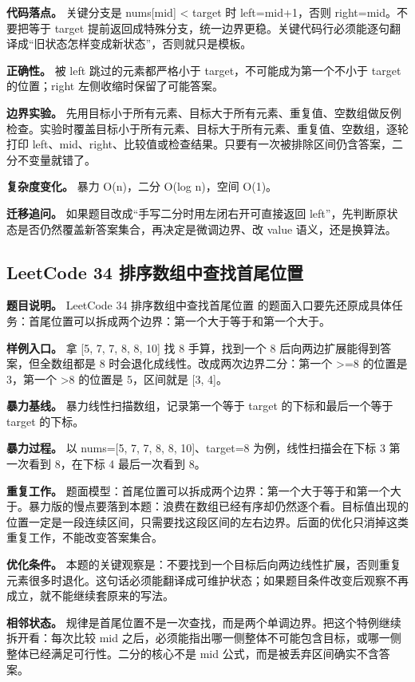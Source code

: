 \textbf{代码落点。} 关键分支是 nums[mid] < target 时 left=mid+1，否则 right=mid。不要把等于 target 提前返回成特殊分支，统一边界更稳。关键代码行必须能逐句翻译成“旧状态怎样变成新状态”，否则就只是模板。

\textbf{正确性。} 被 left 跳过的元素都严格小于 target，不可能成为第一个不小于 target 的位置；right 左侧收缩时保留了可能答案。

\textbf{边界实验。} 先用目标小于所有元素、目标大于所有元素、重复值、空数组做反例检查。实验时覆盖目标小于所有元素、目标大于所有元素、重复值、空数组，逐轮打印 left、mid、right、比较值或检查结果。只要有一次被排除区间仍含答案，二分不变量就错了。

\textbf{复杂度变化。} 暴力 O(n)，二分 O(log n)，空间 O(1)。

\textbf{迁移追问。} 如果题目改成“手写二分时用左闭右开可直接返回 left”，先判断原状态是否仍然覆盖新答案集合，再决定是微调边界、改 value 语义，还是换算法。

\subsection{LeetCode 34 排序数组中查找首尾位置}

\textbf{题目说明。} LeetCode 34 排序数组中查找首尾位置 的题面入口要先还原成具体任务：首尾位置可以拆成两个边界：第一个大于等于和第一个大于。

\textbf{样例入口。} 拿 [5, 7, 7, 8, 8, 10] 找 8 手算，找到一个 8 后向两边扩展能得到答案，但全数组都是 8 时会退化成线性。改成两次边界二分：第一个 >=8 的位置是 3，第一个 >8 的位置是 5，区间就是 [3, 4]。

\textbf{暴力基线。} 暴力线性扫描数组，记录第一个等于 target 的下标和最后一个等于 target 的下标。

\textbf{暴力过程。} 以 nums=[5, 7, 7, 8, 8, 10]、target=8 为例，线性扫描会在下标 3 第一次看到 8，在下标 4 最后一次看到 8。

\textbf{重复工作。} 题面模型：首尾位置可以拆成两个边界：第一个大于等于和第一个大于。暴力版的慢点要落到本题：浪费在数组已经有序却仍然逐个看。目标值出现的位置一定是一段连续区间，只需要找这段区间的左右边界。后面的优化只消掉这类重复工作，不能改变答案集合。

\textbf{优化条件。} 本题的关键观察是：不要找到一个目标后向两边线性扩展，否则重复元素很多时退化。这句话必须能翻译成可维护状态；如果题目条件改变后观察不再成立，就不能继续套原来的写法。

\textbf{相邻状态。} 规律是首尾位置不是一次查找，而是两个单调边界。把这个特例继续拆开看：每次比较 mid 之后，必须能指出哪一侧整体不可能包含目标，或哪一侧整体已经满足可行性。二分的核心不是 mid 公式，而是被丢弃区间确实不含答案。

